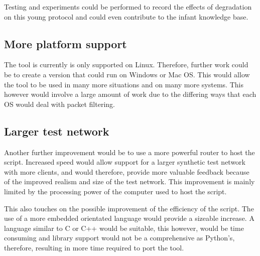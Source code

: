 Testing and experiments could be performed to record the effects of degradation on this young protocol and could even contribute to the infant knowledge base.


\subsection{More platform support}
The tool is currently is only supported on Linux. Therefore, further work could be to create a version that could run on Windows or Mac OS. This would allow the tool to be used in many more situations and on many more systems. This however would involve a large amount of work due to the differing ways that each OS would deal with packet filtering.


\subsection{Larger test network}
Another further improvement would be to use a more powerful router to host the script. Increased speed would allow support for a larger synthetic test network with more clients, and would therefore, provide more valuable feedback because of the improved realism and size of the test network. This improvement is mainly limited by the processing power of the computer used to host the script. 

This also touches on the possible improvement of the efficiency of the script. The use of a more embedded orientated language would provide a sizeable increase. A language similar to C or C++ would be suitable, this however, would be time consuming and library support would not be a comprehensive as Python's, therefore, resulting in more time required to port the tool.